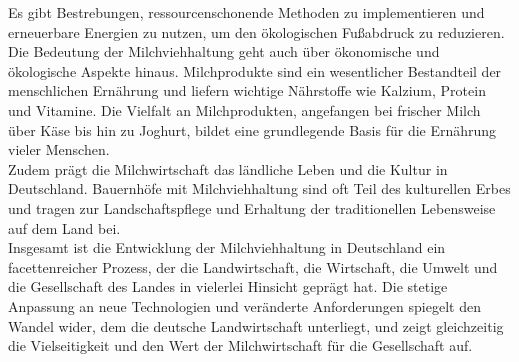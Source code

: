 \documentclass[11pt,a4paper]{report}
\begin{document}
	Es gibt Bestrebungen, ressourcenschonende Methoden zu implementieren und erneuerbare Energien zu nutzen, um den ökologischen Fußabdruck zu reduzieren. \\
	Die Bedeutung der Milchviehhaltung geht auch über ökonomische und ökologische Aspekte hinaus.
	Milchprodukte sind ein wesentlicher Bestandteil der menschlichen Ernährung und liefern wichtige Nährstoffe wie Kalzium, Protein und Vitamine. 
	Die Vielfalt an Milchprodukten, angefangen bei frischer Milch über Käse bis hin zu Joghurt, bildet eine grundlegende Basis für die Ernährung vieler Menschen. \\
	Zudem prägt die Milchwirtschaft das ländliche Leben und die Kultur in Deutschland.
	Bauernhöfe mit Milchviehhaltung sind oft Teil des kulturellen Erbes und tragen zur Landschaftspflege und Erhaltung der traditionellen Lebensweise auf dem Land bei. \\
	Insgesamt ist die Entwicklung der Milchviehhaltung in Deutschland ein facettenreicher Prozess, der die Landwirtschaft, die Wirtschaft, die Umwelt und die Gesellschaft des Landes in vielerlei Hinsicht geprägt hat.
	Die stetige Anpassung an neue Technologien und veränderte Anforderungen spiegelt den Wandel wider, dem die deutsche Landwirtschaft unterliegt, und zeigt gleichzeitig die Vielseitigkeit und den Wert der Milchwirtschaft für die Gesellschaft auf.
\end{document}
